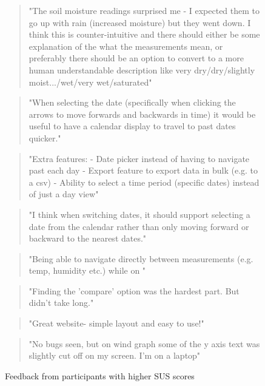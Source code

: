 \begin{figure}[H]
  \centering
  \begin{minipage}{0.9\textwidth}
    \begin{quote}
    "The soil moisture readings surprised me - I expected them to go up with
    rain (increased moisture) but they went down.  I think this is
    counter-intuitive and there should either be some explanation of the what
    the measurements mean, or preferably there should be an option to convert to
    a more human understandable description like very dry/dry/slightly
    moist.../wet/very wet/saturated"
    \end{quote}
 \vspace{8pt}
    \begin{quote}
    "When selecting the date (specifically when clicking the arrows to move
    forwards and backwards in time) it would be useful to have a calendar
    display to travel to past dates quicker."
    \end{quote}
 \vspace{8pt}
    \begin{quote}
    "Extra features: - Date picker instead of having to navigate past each day -
    Export feature to export data in bulk (e.g. to a csv) - Ability to select a
    time period (specific dates) instead of just a day view"
    \end{quote}
 \vspace{8pt}
    \begin{quote}
    "I think when switching dates, it should support selecting a date from the
    calendar rather than only moving forward or backward to the nearest dates."
    \end{quote}
 \vspace{8pt}
    \begin{quote}
    "Being able to navigate directly between measurements (e.g. temp, humidity
    etc.) while on "
    \end{quote}
 \vspace{8pt}
    \begin{quote}
    "Finding the 'compare' option was the hardest part. But didn't take long." 
    \end{quote}
 \vspace{8pt}
    \begin{quote}
    "Great website- simple layout and easy to use!"
    \end{quote}
 \vspace{8pt}
    \begin{quote}
    "No bugs seen, but on wind graph some of the y axis text was slightly cut
    off on my screen. I'm on a laptop"
    \end{quote}
  \end{minipage}
  \caption{Feedback from participants with higher SUS scores}
  \label{fig:high-sus-feedback}
\end{figure}

